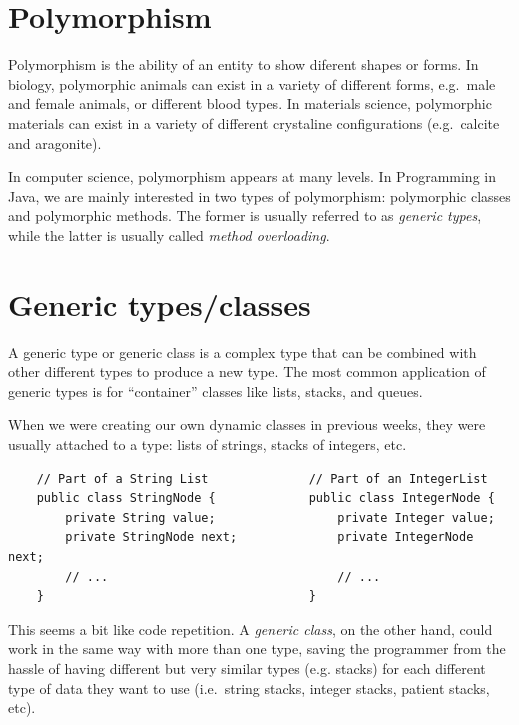 \section{Polymorphism}
\label{sec:polymorphyism}

Polymorphism is the ability of an entity to show diferent shapes or
forms. In biology, polymorphic animals can exist in a variety of
different forms, e.g.~male and female animals, or different blood
types. In materials science, polymorphic materials can exist in a
variety of different crystaline configurations (e.g.~calcite and
aragonite). 

In computer science, polymorphism appears at many levels. In
Programming in Java, we are mainly interested in two types of polymorphism:
polymorphic classes and polymorphic methods. The former is usually
referred to as \emph{generic types}, while the latter is usually
called \emph{method overloading}. 

\section{Generic types/classes}
\label{sec:generic-types}

A generic type or generic class
is a complex type that can be combined with other
different types to produce a new type. 
The most common application of generic types is for
``container'' classes like lists, stacks, and queues. 

When we were creating our own dynamic classes in previous weeks, they
were usually attached to a type: lists of strings, stacks of integers,
etc. 

\begin{verbatim}
    // Part of a String List              // Part of an IntegerList
    public class StringNode {             public class IntegerNode {
        private String value;                 private Integer value;
        private StringNode next;              private IntegerNode next;
        // ...                                // ...
    }                                     }
\end{verbatim}

This seems a bit like code repetition. A \emph{generic class}, on the 
other hand, could work in the same way with more than one
type, saving the programmer from the hassle of having different but very
similar types (e.g. stacks) for each different type of data they want
to use (i.e.~string stacks, integer stacks, patient stacks, etc). 


